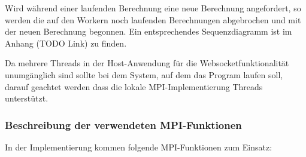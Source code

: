 Wird während einer laufenden Berechnung eine neue Berechnung angefordert, so werden die auf den Workern noch laufenden Berechnungen abgebrochen und mit der neuen Berechnung begonnen. Ein entsprechendes Sequenzdiagramm ist im Anhang (TODO Link) zu finden.

Da mehrere Threads in der Host-Anwendung für die Websocketfunktionalität unumgänglich sind sollte bei dem System,
auf dem das Program laufen soll, darauf geachtet werden dass die lokale MPI-Implementierung Threads unterstützt.

\subsubsection{Beschreibung der verwendeten MPI-Funktionen}

In der Implementierung kommen folgende MPI-Funktionen zum Einsatz:

